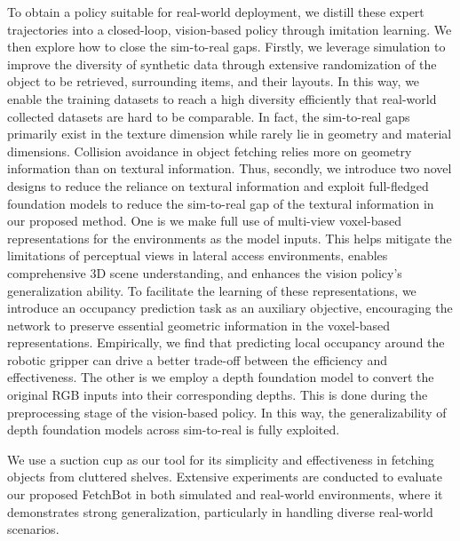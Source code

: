 To obtain a policy suitable for real-world deployment, we distill these expert trajectories into a closed-loop, vision-based policy through imitation learning. We then explore how to close the sim-to-real gaps. 
Firstly, we leverage simulation to improve the diversity of synthetic data through extensive randomization of the object to be retrieved, surrounding items, and their layouts. In this way, we enable the training datasets to reach a high diversity efficiently that real-world collected datasets are hard to be comparable. 
In fact, the sim-to-real gaps primarily exist in the texture dimension while rarely lie in geometry and material dimensions. Collision avoidance in object fetching relies more on geometry information than on textural information. 
Thus, secondly, we introduce two novel designs to reduce the reliance on textural information and exploit full-fledged foundation models to reduce the sim-to-real gap of the textural information in our proposed method. 
One is we make full use of multi-view voxel-based representations for the environments as the model inputs. This helps mitigate the limitations of perceptual views in lateral access environments, enables comprehensive 3D scene understanding, and enhances the vision policy’s generalization ability. To facilitate the learning of these representations, we introduce an occupancy prediction task as an auxiliary objective, encouraging the network to preserve essential geometric information in the voxel-based representations. Empirically, we find that predicting local occupancy around the robotic gripper can drive a better trade-off between the efficiency and effectiveness. 
The other is we employ a depth foundation model to convert the original RGB inputs into their corresponding depths. 
This is done during the preprocessing stage of the vision-based policy. In this way, the generalizability of depth foundation models across sim-to-real is fully exploited.



We use a suction cup as our tool for its simplicity and effectiveness in fetching objects from cluttered shelves. Extensive experiments are conducted to evaluate our proposed FetchBot in both simulated and real-world environments, where it demonstrates strong generalization, particularly in handling diverse real-world scenarios.

